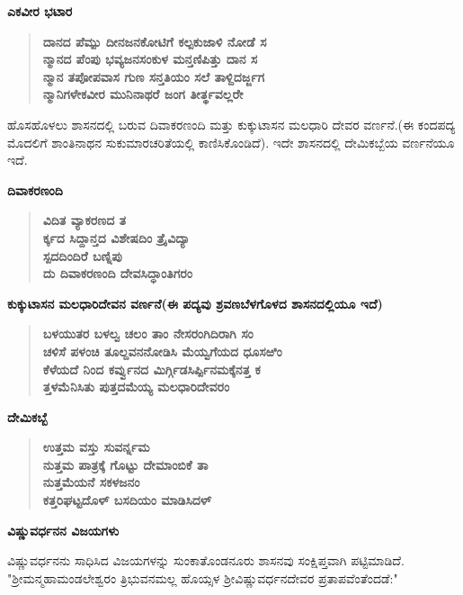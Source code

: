 \newpage

\noindent
\textbf{ಎಕವೀರ ಭಟಾರ}

\begin{verse}
\textbf{ದಾನದ ಪೆಮ್ಪು ದೀನಜನಕೋಟಿಗೆ ಕಲ್ಪಕುಜಾಳಿ ನೋಡೆ ಸ \\ ನ್ಮಾನದ ಪೆಂಪು ಭವ್ಯಜನಸಂಕುಳ ಮನ್ತಣಿಪಿತ್ತು ದಾನ ಸ \\ ನ್ಮಾನ ತಪೋಪವಾಸ ಗುಣ ಸನ್ತತಿಯಂ ಸಲೆ ತಾಳ್ದಿದರ್ಜ್ಜಗ \\ ನ್ಮಾನಿಗಳೇಕವೀರ ಮುನಿನಾಥರೆ ಜಂಗ ತೀರ್ತ್ಥವಲ್ಲರೇ}
\end{verse}

ಹೊಸಹೊಳಲು ಶಾಸನದಲ್ಲಿ ಬರುವ ದಿವಾಕರಣಂದಿ ಮತ್ತು ಕುಕ್ಕುಟಾಸನ ಮಲಧಾರಿ ದೇವರ ವರ್ಣನೆ.\break (ಈ ಕಂದಪದ್ಯ ಮೊದಲಿಗೆ ಶಾಂತಿನಾಥನ ಸುಕುಮಾರಚರಿತೆಯಲ್ಲಿ ಕಾಣಿಸಿಕೊಂಡಿದೆ). ಇದೇ ಶಾಸನದಲ್ಲಿ ದೇಮಿಕಬ್ಬೆಯ ವರ್ಣನೆಯೂ ಇದೆ.

\noindent
\textbf{ದಿವಾಕರಣಂದಿ}

\begin{verse}
\textbf{ವಿದಿತ ವ್ಯಾಕರಣದ ತ \\ ರ್ಕ್ಕದ ಸಿದ್ದಾನ್ತದ ವಿಶೇಷದಿಂ ತ್ರೈವಿದ್ಯಾ \\ ಸ್ಪದದಿಂದಿರೆ ಬಣ್ನಿಪು \\ ದು ದಿವಾಕರಣಂದಿ ದೇವಸಿದ್ಧಾಂತಿಗರಂ}
\end{verse}

\noindent
\textbf{ಕುಕ್ಕುಟಾಸನ ಮಲಧಾರಿದೇವನ ವರ್ಣನೆ(ಈ ಪದ್ಯವು ಶ್ರವಣಬೆಳಗೊಳದ ಶಾಸನದಲ್ಲಿಯೂ ಇದೆ)}

\begin{verse}
\textbf{ಬಳಯುತರ ಬಳಲ್ವ ಚಲಂ ತಾಂ ನೇಸರಂಗಿದಿರಾಗಿ ಸಂ \\ ಚಳಿಸೆ ಪಳಂಚಿ ತೂಲ್ದವನನೋಡಿಸಿ ಮೆಯ್ವಗೆಯದ ಧೂಸಱಿಂ \\ ಕೆಳೆಯದೆ ನಿಂದ ಕರ್ವ್ವುನದ ಮಿರ್ಗ್ಗಿಡಸಿರ್ಪ್ಪಿನಮಕ್ಕೆನತ್ತ ಕ \\ ತ್ತಳಮೆನಿಸಿತು ಪುತ್ತದಮೆಯ್ಯ ಮಲಧಾರಿದೇವರಂ}
\end{verse}

\noindent
\textbf{ದೇಮಿಕಬ್ಬೆ}

\begin{verse}
\textbf{ಉತ್ತಮ ವಸ್ತು ಸುವರ್ನ್ನಮ\\ ನುತ್ತಮ ಪಾತ್ರಕ್ಕೆ ಗೊಟ್ಟು ದೇಮಾಂಬಿಕೆ ತಾ\\ ನುತ್ತಮೆಯನೆ ಸಕಳಜನಂ\\ ಕತ್ತರಿಘಟ್ಟದೊಳ್ ಬಸದಿಯಂ ಮಾಡಿಸಿದಳ್}
\end{verse}

\noindent
\textbf{ವಿಷ್ಣುವರ್ಧನನ ವಿಜಯಗಳು}

ವಿಷ್ಣುವರ್ಧನನು ಸಾಧಿಸಿದ ವಿಜಯಗಳನ್ನು ಸುಂಕಾತೊಂಡನೂರು ಶಾಸನವು ಸಂಕ್ಷಿಪ್ತವಾಗಿ ಪಟ್ಟಿಮಾಡಿದೆ. "ಶ‍್ರೀಮನ್ಮಹಾಮಂಡಲೇಶ್ವರಂ ತ್ರಿಭುವನಮಲ್ಲ ಹೊಯ್ಸಳ ಶ‍್ರೀವಿಷ್ಣುವರ್ಧನದೇವರ ಪ್ರತಾಪವೆಂತೆಂದಡೆ:"

